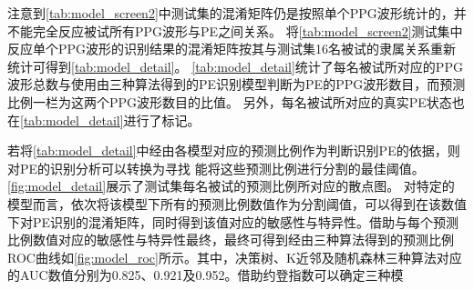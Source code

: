 注意到\autoref{tab:model_screen2}中测试集的混淆矩阵仍是按照单个PPG波形统计的，并不能完全反应被试所有PPG波形与PE之间关系。
将\autoref{tab:model_screen2}测试集中反应单个PPG波形的识别结果的混淆矩阵按其与测试集16名被试的隶属关系重新统计可得到\autoref{tab:model_detail}。
\autoref{tab:model_detail}统计了每名被试所对应的PPG波形总数与使用由三种算法得到的PE识别模型判断为PE的PPG波形数目，而预测比例一栏为这两个PPG波形数目的比值。
另外，每名被试所对应的真实PE状态也在\autoref{tab:model_detail}进行了标记。


若将\autoref{tab:model_detail}中经由各模型对应的预测比例作为判断识别PE的依据，则对PE的识别分析可以转换为寻找
能将这些预测比例进行分割的最佳阈值。\autoref{fig:model_detail}展示了测试集每名被试的预测比例所对应的散点图。
对特定的模型而言，依次将该模型下所有的预测比例数值作为分割阈值，可以得到在该数值下对PE识别的混淆矩阵，同时得到该值对应的敏感性与特异性。借助与每个预测比例数值对应的敏感性与特异性最终，最终可得到经由三种算法得到的预测比例
ROC曲线如\autoref{fig:model_roc}所示。其中，决策树、K近邻及随机森林三种算法对应的AUC数值分别为0.825、0.921及0.952。借助约登指数可以确定三种模

